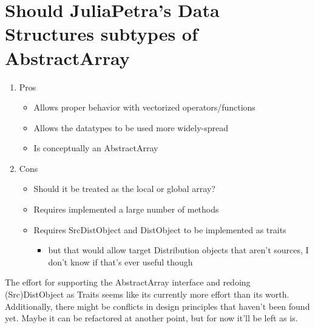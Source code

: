 \documentclass{article}
\begin{document}
\section{Should JuliaPetra's Data Structures subtypes of AbstractArray}
\begin{enumerate}
	\item Pros
	\begin{itemize}
		\item Allows proper behavior with vectorized operators/functions
		\item Allows the datatypes to be used more widely-spread
		\item Is conceptually an AbstractArray
	\end{itemize}

	\item Cons
	\begin{itemize}
		\item Should it be treated as the local or global array?
		\item Requires implemented a large number of methods
		\item Requires SrcDistObject and DistObject to be implemented as traits
		\begin{itemize}
			\item but that would allow target Distribution objects that aren't sources, I don't know if that's ever useful though
		\end{itemize}
	\end{itemize}
\end{enumerate}

The effort for supporting the AbstractArray interface and redoing (Src)DistObject as Traits seems like its currently more effort than its worth.  Additionally, there might be conflicts in design principles that haven't been found yet.  Maybe it can be refactored at another point, but for now it'll be left as is.
\end{document}

